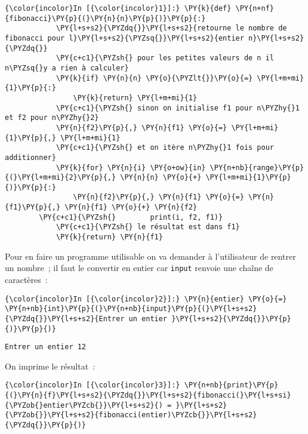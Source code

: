     \begin{Verbatim}[commandchars=\\\{\}]
{\color{incolor}In [{\color{incolor}1}]:} \PY{k}{def} \PY{n+nf}{fibonacci}\PY{p}{(}\PY{n}{n}\PY{p}{)}\PY{p}{:}
            \PY{l+s+s2}{\PYZdq{}}\PY{l+s+s2}{retourne le nombre de fibonacci pour l}\PY{l+s+s2}{\PYZsq{}}\PY{l+s+s2}{entier n}\PY{l+s+s2}{\PYZdq{}}
            \PY{c+c1}{\PYZsh{} pour les petites valeurs de n il n\PYZsq{}y a rien à calculer}
            \PY{k}{if} \PY{n}{n} \PY{o}{\PYZlt{}}\PY{o}{=} \PY{l+m+mi}{1}\PY{p}{:}
                \PY{k}{return} \PY{l+m+mi}{1}
            \PY{c+c1}{\PYZsh{} sinon on initialise f1 pour n\PYZhy{}1 et f2 pour n\PYZhy{}2}
            \PY{n}{f2}\PY{p}{,} \PY{n}{f1} \PY{o}{=} \PY{l+m+mi}{1}\PY{p}{,} \PY{l+m+mi}{1}
            \PY{c+c1}{\PYZsh{} et on itère n\PYZhy{}1 fois pour additionner}
            \PY{k}{for} \PY{n}{i} \PY{o+ow}{in} \PY{n+nb}{range}\PY{p}{(}\PY{l+m+mi}{2}\PY{p}{,} \PY{n}{n} \PY{o}{+} \PY{l+m+mi}{1}\PY{p}{)}\PY{p}{:}
                \PY{n}{f2}\PY{p}{,} \PY{n}{f1} \PY{o}{=} \PY{n}{f1}\PY{p}{,} \PY{n}{f1} \PY{o}{+} \PY{n}{f2}
        \PY{c+c1}{\PYZsh{}        print(i, f2, f1)}
            \PY{c+c1}{\PYZsh{} le résultat est dans f1}
            \PY{k}{return} \PY{n}{f1}
\end{Verbatim}


    Pour en faire un programme utilisable on va demander à l'utilisateur de
rentrer un nombre~; il faut le convertir en entier car \texttt{input}
renvoie une chaîne de caractères~:

    \begin{Verbatim}[commandchars=\\\{\}]
{\color{incolor}In [{\color{incolor}2}]:} \PY{n}{entier} \PY{o}{=} \PY{n+nb}{int}\PY{p}{(}\PY{n+nb}{input}\PY{p}{(}\PY{l+s+s2}{\PYZdq{}}\PY{l+s+s2}{Entrer un entier }\PY{l+s+s2}{\PYZdq{}}\PY{p}{)}\PY{p}{)}
\end{Verbatim}


    \begin{Verbatim}[commandchars=\\\{\}]
Entrer un entier 12

    \end{Verbatim}
    
\newpage

    On imprime le résultat~:

    \begin{Verbatim}[commandchars=\\\{\}]
{\color{incolor}In [{\color{incolor}3}]:} \PY{n+nb}{print}\PY{p}{(}\PY{n}{f}\PY{l+s+s2}{\PYZdq{}}\PY{l+s+s2}{fibonacci(}\PY{l+s+si}{\PYZob{}entier\PYZcb{}}\PY{l+s+s2}{) = }\PY{l+s+s2}{\PYZob{}}\PY{l+s+s2}{fibonacci(entier)\PYZcb{}}\PY{l+s+s2}{\PYZdq{}}\PY{p}{)}
\end{Verbatim}


